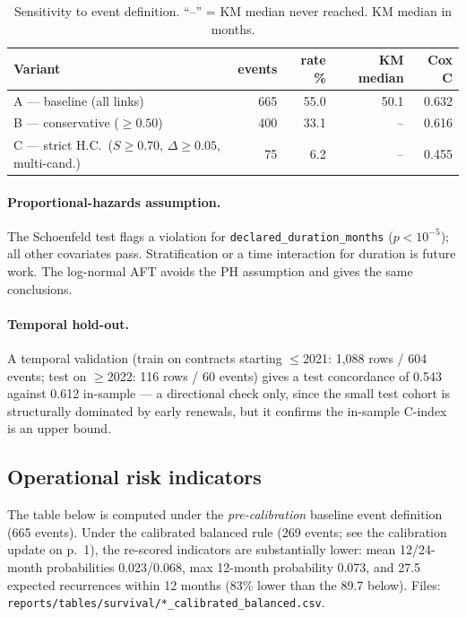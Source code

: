 \documentclass[11pt,a4paper]{article}
\begin{document}
\begin{table}[H]
\centering
\caption{Sensitivity to event definition. ``--'' = KM median never reached.
KM median in months.}
\label{tab:sens}
\small
\begin{tabular}{@{}lrrrr@{}}
\toprule
\textbf{Variant} & \textbf{events} & \textbf{rate \%} & \textbf{KM median} & \textbf{Cox C} \\
\midrule
A --- baseline (all links)            & 665 & 55.0 & 50.1 & 0.632 \\
B --- conservative ($\geq 0.50$)      & 400 & 33.1 & -- & 0.616 \\
C --- strict H.C.\ ($S\!\geq\!0.70$, $\Delta\!\geq\!0.05$, multi-cand.) &  75 & 6.2 & -- & 0.455 \\
\bottomrule
\end{tabular}
\end{table}

\paragraph{Proportional-hazards assumption.} The Schoenfeld test flags a
violation for \nolinkurl{declared_duration_months} ($p < 10^{-5}$); all other
covariates pass. Stratification or a time interaction for duration is future
work. The log-normal AFT avoids the PH assumption and gives the same conclusions.

\paragraph{Temporal hold-out.} A temporal validation (train on contracts
starting $\leq$2021: 1{,}088 rows / 604 events; test on $\geq$2022: 116 rows /
60 events) gives a test concordance of 0.543 against 0.612 in-sample ---
a directional check only, since the small test cohort is structurally dominated
by early renewals, but it confirms the in-sample C-index is an upper bound.

\subsection{Operational risk indicators}

The table below is computed under the \emph{pre-calibration} baseline event
definition (665 events). Under the calibrated balanced rule (269 events; see
the calibration update on p.~1), the re-scored indicators are substantially
lower: mean 12/24-month probabilities 0.023/0.068, max 12-month probability
0.073, and 27.5 expected recurrences within 12 months (83\% lower than the
89.7 below). Files: \nolinkurl{reports/tables/survival/*_calibrated_balanced.csv}.
\end{document}
